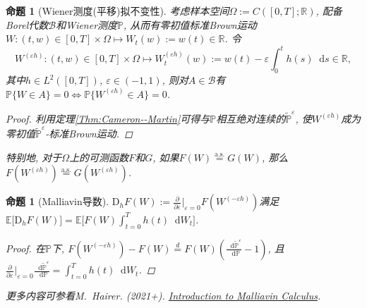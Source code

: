 \documentclass{ctexart}
\theoremstyle{definition}
\theoremstyle{remark}
\theoremstyle{plain}
\newtheorem{Prop}[Def]{命题}
\newcommand{\1}{\mathbbm{1}}				%
\newcommand{\as}{\mathrm{a.s.}}				%
\renewcommand{\P}{\mathbb{P}}				%
\newcommand{\E}{\mathbb{E}}					%
\newcommand{\R}{\mathbb{R}}					%
\newcommand{\tint}{\textstyle\int\nolimits}
\renewcommand*{\d}{\mathop{}\!\mathrm{d}}	%
\newcommand{\pd}{\partial}					%
\newcommand{\p}[3][]{\frac{\pd^{#1}#2}{\pd{#3}^{#1}}}%
\begin{document}
\begin{Prop}[Wiener测度(平移)拟不变性]
考虑样本空间$\Omega := C([0,T];\R)$, 配备Borel代数$\mathscr{B}$和Wiener测度$\P$, 从而有零初值标准Brown运动$W : (t,w) \in [0,T]\times\Omega \mapsto W_{t}(w) := w(t) \in \R$. 令
\[ W^{(\varepsilon h)} : (t,w) \in [0,T]\times\Omega \mapsto W^{(\varepsilon h)}_{t}(w) := w(t) - \varepsilon \tint_{0}^{t} h(s) \d s \in \R , \]
其中$h \in L^{2}([0,T])$, $\varepsilon \in (-1,1)$, 则对$A \in \mathscr{B}$有$\P\{ W \in A \} = 0 \iff \P\{ W^{(\varepsilon h)} \in A \} = 0$.
\begin{proof}
利用定理\ref{Thm:Cameron--Martin}可得与$\P$相互绝对连续的$\tilde{\P}^{\varepsilon}$, 使$W^{(\varepsilon h)}$成为零初值$\tilde{\P}^{\varepsilon}$-标准Brown运动.
\end{proof}
特别地, 对于$\Omega$上的可测函数$F$和$G$, 如果$F(W) \stackrel{\as}{=} G(W)$, 那么$F(W^{(\varepsilon h)}) \stackrel{\as}{=} G(W^{(\varepsilon h)})$.
\end{Prop}
\begin{Prop}[Malliavin导数]
$\mathrm{D}_{h}F(W) := \p{}{\varepsilon}\big|_{\varepsilon=0} F(W^{(-\varepsilon h)})$满足$\E\big[\mathrm{D}_{h}F(W)\big] = \E\big[ F(W) \int_{t=0}^{T} h(t) \d W_{t} \big]$.
\begin{proof}
在$\P$下, $F(W^{(-\varepsilon h)}) - F(W) \stackrel{d}{=} F(W) (\frac{\d\tilde{\P}^{\varepsilon}}{\d\P} - 1)$, 且$\p{}{\varepsilon}\big|_{\varepsilon=0} \frac{\d\tilde{\P}^{\varepsilon}}{\d\P} = \int_{t=0}^{T} h(t) \d W_{t}$.
\end{proof}
\normalfont 更多内容可参看M.~Hairer. (2021+). \href{http://www.hairer.org/notes/Malliavin.pdf}{Introduction to Malliavin Calculus}.
\end{Prop}
\end{document}

